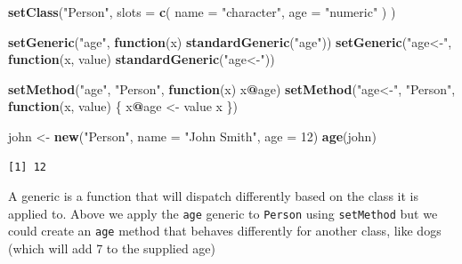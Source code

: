 \documentclass[]{book}
\newenvironment{Shaded}{\begin{snugshade}}{\end{snugshade}}
\newcommand{\ControlFlowTok}[1]{\textcolor[rgb]{0.13,0.29,0.53}{\textbf{#1}}}
\newcommand{\DataTypeTok}[1]{\textcolor[rgb]{0.13,0.29,0.53}{#1}}
\newcommand{\DecValTok}[1]{\textcolor[rgb]{0.00,0.00,0.81}{#1}}
\newcommand{\KeywordTok}[1]{\textcolor[rgb]{0.13,0.29,0.53}{\textbf{#1}}}
\newcommand{\NormalTok}[1]{#1}
\newcommand{\OperatorTok}[1]{\textcolor[rgb]{0.81,0.36,0.00}{\textbf{#1}}}
\newcommand{\StringTok}[1]{\textcolor[rgb]{0.31,0.60,0.02}{#1}}
\begin{document}
\begin{Shaded}
\begin{Highlighting}[]
\KeywordTok{setClass}\NormalTok{(}\StringTok{"Person"}\NormalTok{, }
  \DataTypeTok{slots =} \KeywordTok{c}\NormalTok{(}
    \DataTypeTok{name =} \StringTok{"character"}\NormalTok{, }
    \DataTypeTok{age =} \StringTok{"numeric"}
\NormalTok{  )}
\NormalTok{)}

\KeywordTok{setGeneric}\NormalTok{(}\StringTok{"age"}\NormalTok{, }\ControlFlowTok{function}\NormalTok{(x) }\KeywordTok{standardGeneric}\NormalTok{(}\StringTok{"age"}\NormalTok{))}
\KeywordTok{setGeneric}\NormalTok{(}\StringTok{"age<-"}\NormalTok{, }\ControlFlowTok{function}\NormalTok{(x, value) }\KeywordTok{standardGeneric}\NormalTok{(}\StringTok{"age<-"}\NormalTok{))}

\KeywordTok{setMethod}\NormalTok{(}\StringTok{"age"}\NormalTok{, }\StringTok{"Person"}\NormalTok{, }\ControlFlowTok{function}\NormalTok{(x) x}\OperatorTok{@}\NormalTok{age)}
\KeywordTok{setMethod}\NormalTok{(}\StringTok{"age<-"}\NormalTok{, }\StringTok{"Person"}\NormalTok{, }\ControlFlowTok{function}\NormalTok{(x, value) \{}
\NormalTok{  x}\OperatorTok{@}\NormalTok{age <-}\StringTok{ }\NormalTok{value}
\NormalTok{  x}
\NormalTok{\})}

\NormalTok{john <-}\StringTok{ }\KeywordTok{new}\NormalTok{(}\StringTok{"Person"}\NormalTok{, }\DataTypeTok{name =} \StringTok{"John Smith"}\NormalTok{, }\DataTypeTok{age =} \DecValTok{12}\NormalTok{)}
\KeywordTok{age}\NormalTok{(john)}
\end{Highlighting}
\end{Shaded}

\begin{verbatim}
[1] 12
\end{verbatim}

A generic is a function that will dispatch differently based on the class it is applied to. Above we apply the \texttt{age} generic to \texttt{Person} using \texttt{setMethod} but we could create an \texttt{age} method that behaves differently for another class, like dogs (which will add 7 to the supplied age)
\end{document}
